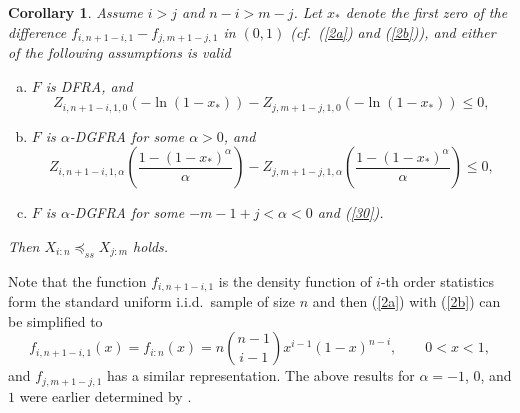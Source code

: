 \documentclass [11pt]{article}
\newtheorem{corollary}{Corollary}
\begin{document}
{\samepage
\begin{corollary}\label{coos3}
Assume $i>j$ and $n-i > m-j$. Let $x_*$ denote the first zero of the difference $f_{i,n+1-i,1} - f_{j,m+1-j,1}$ in $(0,1)$ (cf.\ (\ref{2a}) and (\ref{2b})),
and either of the following assumptions is valid
\begin{enumerate}[(a)]
\item
$F$ is DFRA, and
\begin{equation}
\label{29}
Z_{i,n+1-i,1,0} \left( - \ln(1-x_*)\right)
-
Z_{j,m+1-j,1,0} \left( - \ln(1-x_*)\right)
\leq 0,
\end{equation}

\item
$F$ is $\alpha$-DGFRA for some $\alpha >0$, and
\begin{equation}
\label{30}
Z_{i,n+1-i,1,\alpha} \left(  \frac{1-(1-x_*)^\alpha}{\alpha}\right)
-
Z_{j,m+1-j,1,\alpha} \left(  \frac{1-(1-x_*)^\alpha}{\alpha}\right)
\leq 0,
\end{equation}

\item
$F$ is $\alpha$-DGFRA for some $-m-1+j < \alpha < 0$ and (\ref{30}). 
\end{enumerate}
Then $X_{i:n} \preceq_{ss} X_{j:m}$ holds.
\end{corollary}}
Note that the function $f_{i,n+1-i,1}$ is the density function of $i$-th order statistics form the standard uniform i.i.d.\ sample of size $n$ and then (\ref{2a}) with (\ref{2b}) can be simplified to
\begin{equation*}
\label{31}
f_{i,n+1-i,1}(x) = f_{i:n}(x) = n {n-1 \choose i-1} x^{i-1} (1-x)^{n-i}, \qquad 0<x<1,
\end{equation*}
and $f_{j,m+1-j,1}$ has a similar representation.
The above results for $\alpha=-1$, $0$, and $1$ were earlier determined by \cite{ALO-JAP}.
\end{document}
